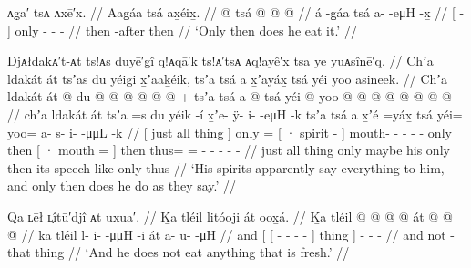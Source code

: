 \ex\label{ex:100-226-then-eat-it}%
%
\begingl
	\glpreamble	ᴀg̣a′ tsᴀ ᴀxē′x. //
	\glpreamble	Aag̱áa tsá ax̱éix̱. //
	\gla	{}  @ {} {} tsá
		 @ {} @ {} @ {} //
	\glb	{} á -g̱áa {} tsá 
		a-  -eμH -x̱ //
	\glc	{}[  - {}] only
		-  - - //
	\gld	{} then -after {} then
		 {} {} {} {} {} {} {} //
	\glft	‘Only then does he eat it.’
		//
\endgl
\xe

\ex\label{ex:100-227-what-they-tell-him-he-does}%
%
\begingl
	\glpreamble	Djᴀłdakᴀ′t-ᴀt ts!ᴀs duyē′gî q!ᴀqā′k ts!ᴀ′tsᴀ ᴀq!ayê′x tsa ye yuᴀsînē′q. //
	\glpreamble	Chʼa ldakát át tsʼas du yéigi x̱ʼaaḵéik, tsʼa tsá a x̱ʼayáx̱ tsá yéi yoo asineek. //
	\gla	{} Chʼa ldakát át {}
		 @ {} 
		{} du  @ {} {}
		 @ {} @ {} @ {} @ {} @ {} +
		tsʼa tsá 
		{} a  @ {} {}
		tsá
		yéi @ yoo @  @ {} @ {} @ {} @ {} @ {} @ {} @ {} //
	\glb	{} chʼa ldakát át {}
		tsʼa =s
		{} du yéik -í {}
		x̱ʼe- ÿ- i-  -eμH -k
		tsʼa tsá
		{} a x̱ʼé =yáx̱ {}
		tsá
		yéi= yoo= a- s- i-  -μμL -k //
	\glc	{}[ just all thing {}]
		only =
		{}[ · spirit - {}]
		mouth- - -  - -
		only then
		{}[ · mouth = {}]
		then
		thus= = - - -  - - //
	\gld	{} just all thing {}
		only \•maybe
		{} his  {} {}
		 {} {} {} {} {}
		only then
		{} its speech \•like {} 
		only
		thus   {} {} {} {} {}  //
	\glft	‘His spirits apparently say everything to him, and only then does he do as they say.’
		//
\endgl
\xe

\ex\label{ex:100-228-dont-eat-fresh}%
%
\begingl
	\glpreamble	Qa ʟēł ʟ̣îtū′djî ᴀt uxua′. //
	\glpreamble	Ḵa tléil litóoji át oox̱á. //
	\gla	Ḵa tléil {} {}  @ {} @ {} @ {} @ {} {} át {}
		 @ {} @ {} @ {} //
	\glb	ḵa tléil {} {} l- i-  -μμH -i {} át {}
		a- u-  -μH //
	\glc	and  {}[ {}[ - -  - - {}] thing {}]
		- -  - //
	\gld	and not {} {}  {} {} {} -that {} thing {}
		 {} {} {} //
	\glft	‘And he does not eat anything that is fresh.’
		//
\endgl
\xe

